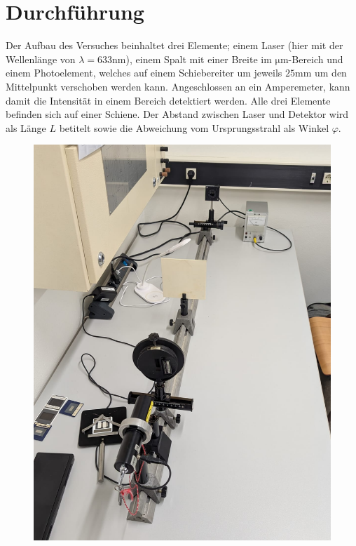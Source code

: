 \section{Durchführung}
\label{sec:Durchführung}

Der Aufbau des Versuches beinhaltet drei Elemente; einem Laser (hier mit der 
Wellenlänge von $\lambda = 633 \unit{\nano\meter}$), einem Spalt mit einer 
Breite im $\unit{\micro\meter}$-Bereich und einem Photoelement, welches auf 
einem Schiebereiter um jeweils $25 \unit{\milli\meter}$ um den Mittelpunkt 
verschoben werden kann. Angeschlossen an ein Amperemeter, kann damit die 
Intensität in einem Bereich detektiert werden. Alle drei Elemente befinden 
sich auf einer Schiene. Der Abstand zwischen Laser und Detektor wird als 
Länge $L$ betitelt sowie die Abweichung vom Ursprungsstrahl als Winkel 
$\varphi$.
\begin{figure}[H]
    \centering
    \begin{minipage}{0.45\textwidth}
        \label{fig:f2}
        \centering
        \includegraphics[width=\textwidth]{Bilder/A1.jpg}

\end{minipage}
\end{figure}
